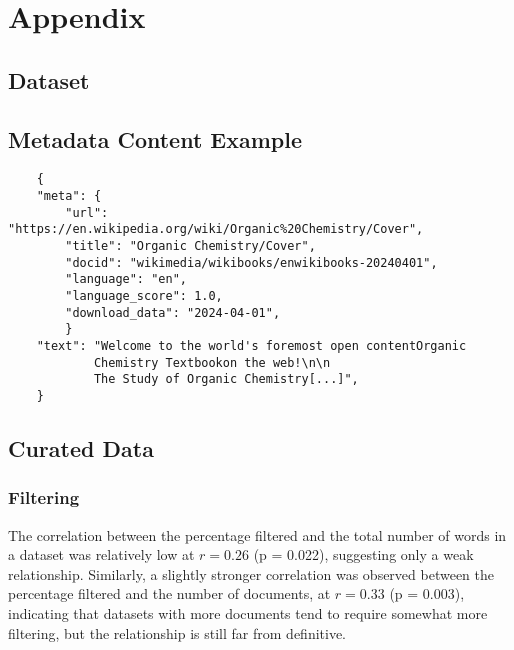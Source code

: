 \section*{Appendix}\label{sec:appendix}

\subsection{Dataset}



\subsection{Metadata Content Example}
\label{ssec:appendix.metadataexample}

\begin{verbatim}
    {
    "meta": {
        "url": "https://en.wikipedia.org/wiki/Organic%20Chemistry/Cover", 
        "title": "Organic Chemistry/Cover", 
        "docid": "wikimedia/wikibooks/enwikibooks-20240401", 
        "language": "en", 
        "language_score": 1.0, 
        "download_data": "2024-04-01", 
        }
    "text": "Welcome to the world's foremost open contentOrganic
            Chemistry Textbookon the web!\n\n
            The Study of Organic Chemistry[...]", 
    }
\end{verbatim}


\subsection{Curated Data}
\label{sec:appendix.curated}

\subsubsection{Filtering}
\label{sec:appendix.curated.filtering}
The correlation between the percentage filtered and the total number of words in a dataset was relatively low at \( r = 0.26 \) (p = 0.022), suggesting only a weak relationship. Similarly, a slightly stronger correlation was observed between the percentage filtered and the number of documents, at \( r = 0.33 \) (p = 0.003), indicating that datasets with more documents tend to require somewhat more filtering, but the relationship is still far from definitive.

